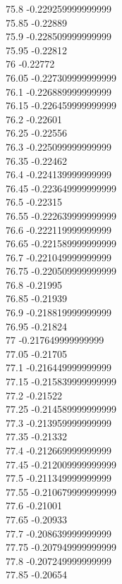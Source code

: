 {75.8	-0.229259999999999\\
75.85	-0.22889\\
75.9	-0.228509999999999\\
75.95	-0.22812\\
76	-0.22772\\
76.05	-0.227309999999999\\
76.1	-0.226889999999999\\
76.15	-0.226459999999999\\
76.2	-0.22601\\
76.25	-0.22556\\
76.3	-0.225099999999999\\
76.35	-0.22462\\
76.4	-0.224139999999999\\
76.45	-0.223649999999999\\
76.5	-0.22315\\
76.55	-0.222639999999999\\
76.6	-0.222119999999999\\
76.65	-0.221589999999999\\
76.7	-0.221049999999999\\
76.75	-0.220509999999999\\
76.8	-0.21995\\
76.85	-0.21939\\
76.9	-0.218819999999999\\
76.95	-0.21824\\
77	-0.217649999999999\\
77.05	-0.21705\\
77.1	-0.216449999999999\\
77.15	-0.215839999999999\\
77.2	-0.21522\\
77.25	-0.214589999999999\\
77.3	-0.213959999999999\\
77.35	-0.21332\\
77.4	-0.212669999999999\\
77.45	-0.212009999999999\\
77.5	-0.211349999999999\\
77.55	-0.210679999999999\\
77.6	-0.21001\\
77.65	-0.20933\\
77.7	-0.208639999999999\\
77.75	-0.207949999999999\\
77.8	-0.207249999999999\\
77.85	-0.20654\\
}
